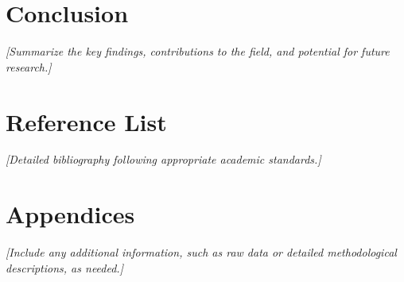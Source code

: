 \documentclass{article}
\begin{document}
\section{Conclusion}
    \textit{[Summarize the key findings, contributions to the field, and potential for future research.]}

\section{Reference List}
    \textit{[Detailed bibliography following appropriate academic standards.]}

\section{Appendices}
    \textit{[Include any additional information, such as raw data or detailed methodological descriptions, as needed.]}
\end{document}
